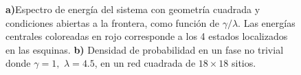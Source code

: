 \begin{figure}[h!]
\begin{subfigure}[b!]{0.56 \textwidth}
         \label{}
     \end{subfigure}\hspace*{1em} \vspace*{-1.5em}
        \caption{\textbf{a)}Espectro de energía del sistema con geometría cuadrada y condiciones abiertas a la frontera, como función de $\gamma/\lambda$. Las energías centrales coloreadas en rojo corresponde a los 4 estados localizados en las esquinas. \textbf{b)} Densidad de probabilidad en un fase no trivial donde $\gamma = 1,\, \, \lambda = 4.5$, en un red cuadrada de $18\times18$ sitios.}
    \label{fig:Pram_Proy_cuadrado}
\end{figure}